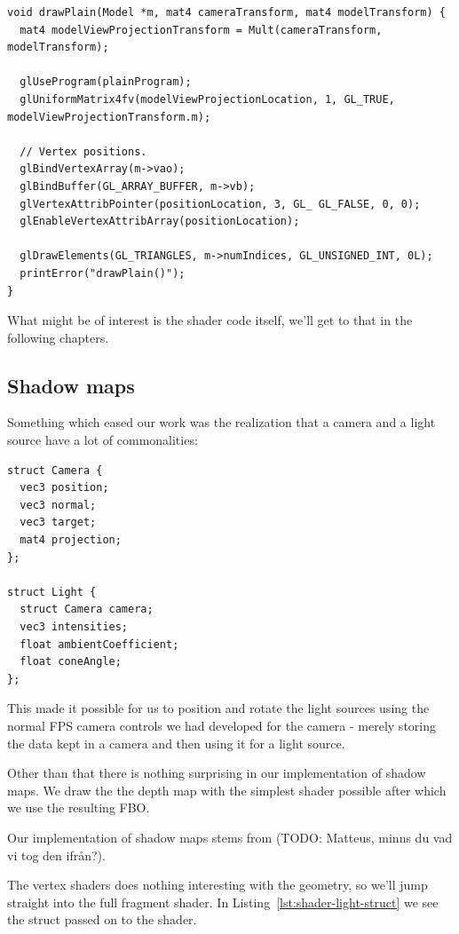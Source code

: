 \documentclass[a4paper,12pt]{article}
\begin{document}
\begin{lstlisting}[label=lst:drawPlain,caption= The contents of the drawPlain function.]
void drawPlain(Model *m, mat4 cameraTransform, mat4 modelTransform) {
  mat4 modelViewProjectionTransform = Mult(cameraTransform, modelTransform);

  glUseProgram(plainProgram);
  glUniformMatrix4fv(modelViewProjectionLocation, 1, GL_TRUE, modelViewProjectionTransform.m);

  // Vertex positions.
  glBindVertexArray(m->vao);
  glBindBuffer(GL_ARRAY_BUFFER, m->vb);
  glVertexAttribPointer(positionLocation, 3, GL_ GL_FALSE, 0, 0);
  glEnableVertexAttribArray(positionLocation);

  glDrawElements(GL_TRIANGLES, m->numIndices, GL_UNSIGNED_INT, 0L);
  printError("drawPlain()");
}
\end{lstlisting}

What might be of interest is the shader code itself, we'll get to that in the following chapters.


\subsection{Shadow maps}

Something which eased our work was the realization that a camera and a light source have a lot of commonalities:

\begin{lstlisting}[label=lst:lamp-struct,caption=Light source struct]
struct Camera {
  vec3 position;
  vec3 normal;
  vec3 target;
  mat4 projection;
};

struct Light {
  struct Camera camera;
  vec3 intensities;
  float ambientCoefficient;
  float coneAngle;
};
\end{lstlisting}

This made it possible for us to position and rotate the light sources using the normal FPS camera controls we had developed for the camera - merely storing the data kept in a camera and then using it for a light source.

Other than that there is nothing surprising in our implementation of shadow maps. We draw the the depth map with the simplest shader possible after which we use the resulting FBO.

Our implementation of shadow maps stems from (TODO: Matteus, minns du vad vi tog den ifrån?).

The vertex shaders does nothing interesting with the geometry, so we'll jump straight into the full fragment shader. In Listing~\ref{lst:shader-light-struct} we see the struct passed on to the shader.
\end{document}
